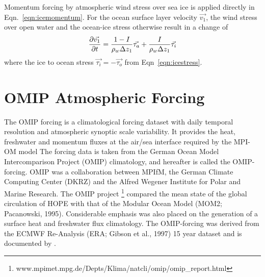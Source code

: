Momentum forcing by atmospheric wind stress over sea ice is applied directly in Eqn.~\ref{eqn:icemomentum}.
For the ocean surface layer velocity $\vec{v_1}$,
the wind stress over open water and the ocean-ice stress otherwise 
result in a change of
\begin{equation}
\label{eqn:ocstress}
{\partial \vec{v_1} \over {\partial t}} = 
{1-I \over {\rho_w \Delta z_1}} \vec{\tau_a}
+{I \over {\rho_w \Delta z_1}} \vec{\tau_i}
\end{equation}
where the ice to ocean stress $\vec{\tau_i} = -\vec{\tau_o}$ from Eqn~\ref{eqn:icestress}.

\section{OMIP Atmospheric Forcing}
\label{sec:numeric:omip}

The OMIP forcing is a climatological forcing dataset with daily temporal resolution
and atmospheric synoptic scale variability. It provides the 
heat, freshwater and momentum fluxes at the air/sea interface required by the \mbox{MPI-OM} model
The forcing data is taken from the German Ocean Model Intercomparison Project (OMIP)
climatology, and hereafter is called the OMIP-forcing.
OMIP was a collaboration between MPIfM,
the German Climate Computing Center (DKRZ)
and the Alfred Wegener Institute for Polar and Marine Research.
The OMIP project 
\footnote{www.mpimet.mpg.de/Depts/Klima/natcli/omip/omip\_report.html}
compared the mean state of the global circulation of {HOPE}
with that of the Modular Ocean Model (MOM2; Pacanowski, 1995). \nocite{pacanowski95}
Considerable emphasis was also placed on the generation of a surface heat and
freshwater flux climatology.
The OMIP-forcing was derived from the ECMWF Re-Analysis (ERA; Gibson et al., 1997)\nocite{gibson97} 
15 year dataset and is documented by \citet{roeske01}.

